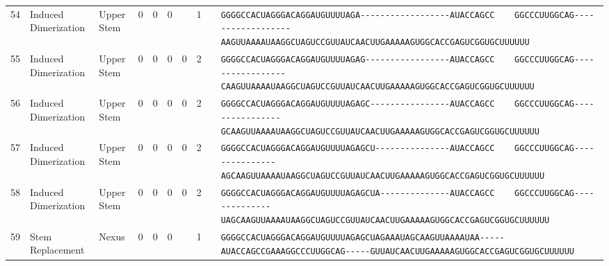 \begin{tabular}{rllrrrrrcl}
 54 & Induced Dimerization & Upper Stem & 0 & 0 & 0 &  & 1 &  &
 \color{ucsfblack}\verb|GGGGCCACUAGGGACAGGAU|\color{ucsfblue}\verb|GUUUUAGA------------------|\color{ucsfpurple}\verb|AUACCAGCC    GGCCCUUGGCAG|\color{ucsfblue}\verb|------------------AAGUUAAAAU|\color{ucsfnavy}\verb|AAGGCUAGUCCGU|\color{ucsfteal}\verb|UAUCAACUUGAAAAAGUGGCACCGAGUCGGUGC|\color{ucsfblack}\verb|UUUUUU| \\

 55 & Induced Dimerization & Upper Stem & 0 & 0 & 0 & 0 & 2 &  &
 \color{ucsfblack}\verb|GGGGCCACUAGGGACAGGAU|\color{ucsfblue}\verb|GUUUUAGAG-----------------|\color{ucsfpurple}\verb|AUACCAGCC    GGCCCUUGGCAG|\color{ucsfblue}\verb|-----------------CAAGUUAAAAU|\color{ucsfnavy}\verb|AAGGCUAGUCCGU|\color{ucsfteal}\verb|UAUCAACUUGAAAAAGUGGCACCGAGUCGGUGC|\color{ucsfblack}\verb|UUUUUU| \\

 56 & Induced Dimerization & Upper Stem & 0 & 0 & 0 & 0 & 2 &  &
 \color{ucsfblack}\verb|GGGGCCACUAGGGACAGGAU|\color{ucsfblue}\verb|GUUUUAGAGC----------------|\color{ucsfpurple}\verb|AUACCAGCC    GGCCCUUGGCAG|\color{ucsfblue}\verb|----------------GCAAGUUAAAAU|\color{ucsfnavy}\verb|AAGGCUAGUCCGU|\color{ucsfteal}\verb|UAUCAACUUGAAAAAGUGGCACCGAGUCGGUGC|\color{ucsfblack}\verb|UUUUUU| \\

 57 & Induced Dimerization & Upper Stem & 0 & 0 & 0 & 0 & 2 &  &
 \color{ucsfblack}\verb|GGGGCCACUAGGGACAGGAU|\color{ucsfblue}\verb|GUUUUAGAGCU---------------|\color{ucsfpurple}\verb|AUACCAGCC    GGCCCUUGGCAG|\color{ucsfblue}\verb|---------------AGCAAGUUAAAAU|\color{ucsfnavy}\verb|AAGGCUAGUCCGU|\color{ucsfteal}\verb|UAUCAACUUGAAAAAGUGGCACCGAGUCGGUGC|\color{ucsfblack}\verb|UUUUUU| \\

 58 & Induced Dimerization & Upper Stem & 0 & 0 & 0 & 0 & 2 &  &
 \color{ucsfblack}\verb|GGGGCCACUAGGGACAGGAU|\color{ucsfblue}\verb|GUUUUAGAGCUA--------------|\color{ucsfpurple}\verb|AUACCAGCC    GGCCCUUGGCAG|\color{ucsfblue}\verb|--------------UAGCAAGUUAAAAU|\color{ucsfnavy}\verb|AAGGCUAGUCCGU|\color{ucsfteal}\verb|UAUCAACUUGAAAAAGUGGCACCGAGUCGGUGC|\color{ucsfblack}\verb|UUUUUU| \\

 59 & Stem Replacement & Nexus & 0 & 0 & 0 &  & 1 &  &
 \color{ucsfblack}\verb|GGGGCCACUAGGGACAGGAU|\color{ucsfblue}\verb|GUUUUAGAGCUAGAAAUAGCAAGUUAAAAU|\color{ucsfnavy}\verb|AA-----|\color{ucsfpurple}\verb|AUACCAGCCGAAAGGCCCUUGGCAG|\color{ucsfnavy}\verb|-----GU|\color{ucsfteal}\verb|UAUCAACUUGAAAAAGUGGCACCGAGUCGGUGC|\color{ucsfblack}\verb|UUUUUU| \\


\end{tabular}
